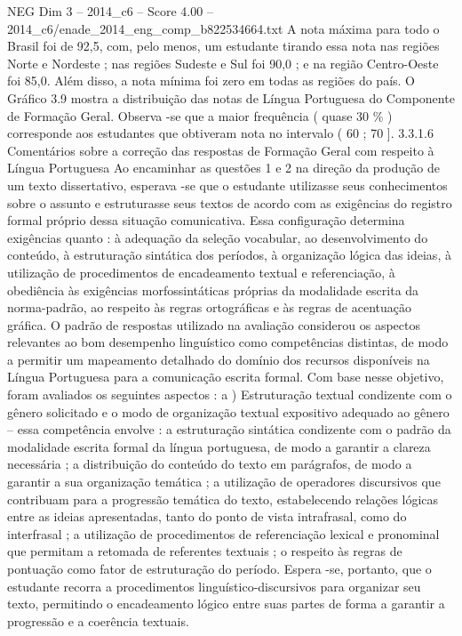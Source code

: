 \begin{textsample}{NEG Dim 3 – 2014\_c6 – Score 4.00 – 2014\_c6/enade\_2014\_eng\_comp\_b822534664.txt}
A nota máxima para todo o Brasil foi de 92,5, com, pelo menos, um estudante tirando essa nota nas regiões Norte e Nordeste ; nas regiões Sudeste e Sul foi 90,0 ; e na região Centro-Oeste foi 85,0.
Além disso, a nota mínima foi zero em todas as regiões do país.
O Gráfico 3.9 mostra a distribuição das notas de Língua Portuguesa do Componente de Formação Geral.
Observa -se que a maior frequência ( quase 30 \% ) corresponde aos estudantes que obtiveram nota no intervalo ( 60 ; 70 ]. 3.3.1.6 Comentários sobre a correção das respostas de Formação Geral com respeito à Língua Portuguesa Ao encaminhar as questões 1 e 2 na direção da produção de um texto dissertativo, esperava -se que o estudante utilizasse seus conhecimentos sobre o assunto e estruturasse seus textos de acordo com as exigências do registro formal próprio dessa situação comunicativa.
Essa configuração determina exigências quanto : à adequação da seleção vocabular, ao desenvolvimento do conteúdo, à estruturação sintática dos períodos, à organização lógica das ideias, à utilização de procedimentos de encadeamento textual e referenciação, à obediência às exigências morfossintáticas próprias da modalidade escrita da norma-padrão, ao respeito às regras ortográficas e às regras de acentuação gráfica.
O padrão de respostas utilizado na avaliação considerou os aspectos relevantes ao bom desempenho linguístico como competências distintas, de modo a permitir um mapeamento detalhado do domínio dos recursos disponíveis na Língua Portuguesa para a comunicação escrita formal.
Com base nesse objetivo, foram avaliados os seguintes aspectos : a ) Estruturação textual condizente com o gênero solicitado e o modo de organização textual expositivo adequado ao gênero – essa competência envolve : a estruturação sintática condizente com o padrão da modalidade escrita formal da língua portuguesa, de modo a garantir a clareza necessária ; a distribuição do conteúdo do texto em parágrafos, de modo a garantir a sua organização temática ; a utilização de operadores discursivos que contribuam para a progressão temática do texto, estabelecendo relações lógicas entre as ideias apresentadas, tanto do ponto de vista intrafrasal, como do interfrasal ; a utilização de procedimentos de referenciação lexical e pronominal que permitam a retomada de referentes textuais ; o respeito às regras de pontuação como fator de estruturação do período.
Espera -se, portanto, que o estudante recorra a procedimentos linguístico-discursivos para organizar seu texto, permitindo o encadeamento lógico entre suas partes de forma a garantir a progressão e a coerência textuais.

\end{textsample}
